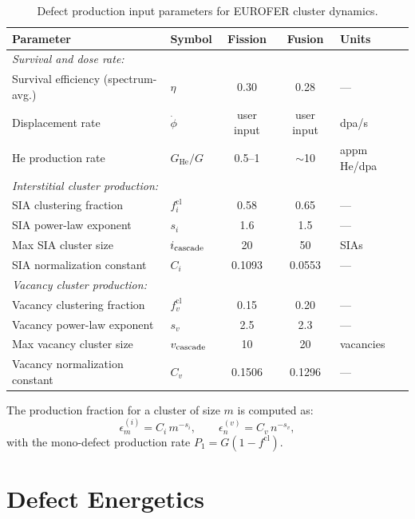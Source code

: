 \documentclass[pdflatex,sn-basic]{sn-jnl} %
\begin{document}
\begin{table}[htbp]
\centering
\caption{Defect production input parameters for EUROFER cluster dynamics.}
\label{tab:prod_params}
\renewcommand{\arraystretch}{1.15}
\begin{tabular}{@{}llccl@{}}
\toprule
\textbf{Parameter} & \textbf{Symbol} & \textbf{Fission} & \textbf{Fusion} & \textbf{Units} \\
\midrule
\multicolumn{5}{l}{\emph{Survival and dose rate:}} \\
Survival efficiency (spectrum-avg.) & $\eta$ & 0.30 & 0.28 & --- \\
Displacement rate & $\dot{\phi}$ & user input & user input & dpa/s \\
He production rate & $G_{\mathrm{He}}/G$ & 0.5--1 & $\sim$10 & appm He/dpa \\[4pt]

\multicolumn{5}{l}{\emph{Interstitial cluster production:}} \\
SIA clustering fraction & $f_i^{\mathrm{cl}}$ & 0.58 & 0.65 & --- \\
SIA power-law exponent & $s_i$ & 1.6 & 1.5 & --- \\
Max SIA cluster size & $i_{\rm cascade}$ & 20 & 50 & SIAs \\
SIA normalization constant & $C_i$ & 0.1093 & 0.0553 & --- \\[4pt]

\multicolumn{5}{l}{\emph{Vacancy cluster production:}} \\
Vacancy clustering fraction & $f_v^{\mathrm{cl}}$ & 0.15 & 0.20 & --- \\
Vacancy power-law exponent & $s_v$ & 2.5 & 2.3 & --- \\
Max vacancy cluster size & $v_{\rm cascade}$ & 10 & 20 & vacancies \\
Vacancy normalization constant & $C_v$ & 0.1506 & 0.1296 & --- \\
\bottomrule
\end{tabular}
\end{table}

The production fraction for a cluster of size $m$ is computed as:
\begin{equation}
    \epsilon_m^{(i)} = C_i\,m^{-s_i}, \qquad
    \epsilon_n^{(v)} = C_v\,n^{-s_v},
\end{equation}
with the mono-defect production rate $P_1 = G(1 - f^{\mathrm{cl}})$.

\section{Defect Energetics}
\end{document}
